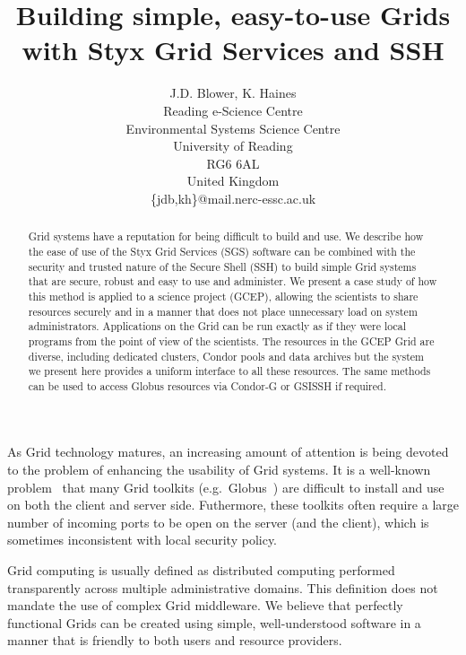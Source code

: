 \documentclass[times,10pt,twocolumn,8.5x11]{article}
\begin{document}
\title{Building simple, easy-to-use Grids with Styx Grid Services and SSH}

\author{
J.D. Blower, K. Haines\\
Reading e-Science Centre\\
Environmental Systems Science Centre\\
University of Reading\\
RG6 6AL\\
United Kingdom\\
\{jdb,kh\}@mail.nerc-essc.ac.uk
}

\maketitle
\thispagestyle{empty}

\begin{abstract}
Grid systems have a reputation for being difficult to build and use.  We describe how the ease of use of the Styx Grid Services (SGS) software can be combined with the security and trusted nature of the Secure Shell (SSH) to build simple Grid systems that are secure, robust and easy to use and administer.  We present a case study of how this method is applied to a science project (GCEP), allowing the scientists to share resources securely and in a manner that does not place unnecessary load on system administrators.  Applications on the Grid can be run exactly as if they were local programs from the point of view of the scientists.  The resources in the GCEP Grid are diverse, including dedicated clusters, Condor pools and data archives but the system we present here provides a uniform interface to all these resources.  The same methods can be used to access Globus resources via Condor-G or GSISSH if required.
\end{abstract}



As Grid technology matures, an increasing amount of attention is being devoted to the problem of enhancing the usability of Grid systems.  It is a well-known problem~\cite{chin:2004} that many Grid toolkits (e.g.\ Globus~\cite{globustoolkit}) are difficult to install and use on both the client and server side.  Futhermore, these toolkits often require a large number of incoming ports to be open on the server (and the client), which is sometimes inconsistent with local security policy.

Grid computing is usually defined as distributed computing performed transparently across multiple administrative domains.  This definition does not mandate the use of complex Grid middleware.  We believe that perfectly functional Grids can be created using simple, well-understood software in a manner that is friendly to both users and resource providers.
\end{document}

